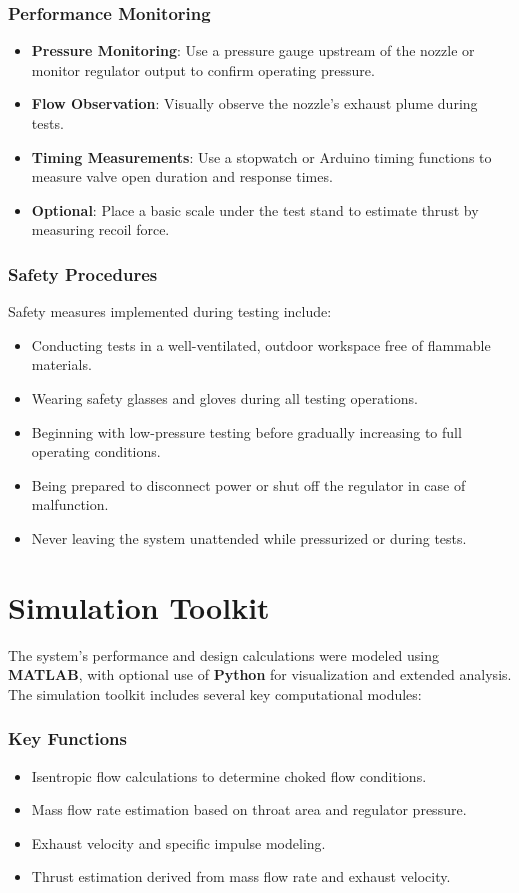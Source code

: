 \documentclass{new-aiaa}
\begin{document}
\subsubsection{Performance Monitoring}
\begin{itemize}
    \item \textbf{Pressure Monitoring}: Use a pressure gauge upstream of the nozzle or monitor regulator output to confirm operating pressure.
    \item \textbf{Flow Observation}: Visually observe the nozzle’s exhaust plume during tests.
    \item \textbf{Timing Measurements}: Use a stopwatch or Arduino timing functions to measure valve open duration and response times.
    \item \textbf{Optional}: Place a basic scale under the test stand to estimate thrust by measuring recoil force.
\end{itemize}

\subsubsection{Safety Procedures}
Safety measures implemented during testing include:
\begin{itemize}
    \item Conducting tests in a well-ventilated, outdoor workspace free of flammable materials.
    \item Wearing safety glasses and gloves during all testing operations.
    \item Beginning with low-pressure testing before gradually increasing to full operating conditions.
    \item Being prepared to disconnect power or shut off the regulator in case of malfunction.
    \item Never leaving the system unattended while pressurized or during tests.
\end{itemize}

\section{Simulation Toolkit}

The system’s performance and design calculations were modeled using \textbf{MATLAB}, with optional use of \textbf{Python} for visualization and extended analysis. The simulation toolkit includes several key computational modules:

\subsubsection{Key Functions}
\begin{itemize}
    \item Isentropic flow calculations to determine choked flow conditions.
    \item Mass flow rate estimation based on throat area and regulator pressure.
    \item Exhaust velocity and specific impulse modeling.
    \item Thrust estimation derived from mass flow rate and exhaust velocity.
\end{itemize}
\end{document}
